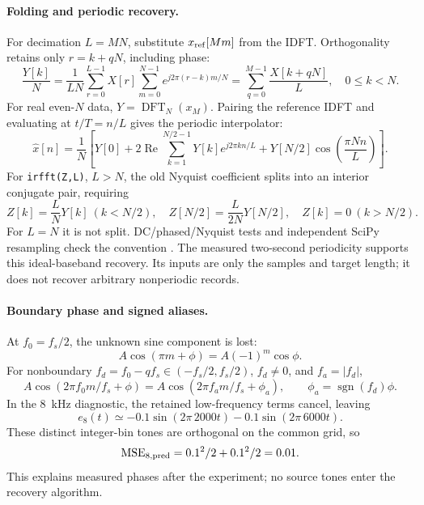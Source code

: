 \paragraph{Folding and periodic recovery.}
For decimation $L=MN$, substitute $x_{\rm ref}[Mm]$ from the IDFT.
Orthogonality retains only $r=k+qN$, including phase:
\begin{equation}
 \frac{Y[k]}N=\frac1{LN}\sum_{r=0}^{L-1}X[r]
 \sum_{m=0}^{N-1}e^{j2\pi(r-k)m/N}
 =\sum_{q=0}^{M-1}\frac{X[k+qN]}L,\quad0\le k<N.
 \label{eq:decimation-folding}
\end{equation}
For real even-$N$ data, $Y=\operatorname{DFT}_N(x_M)$. Pairing the reference
IDFT and evaluating at $t/T=n/L$ gives the periodic interpolator:
\begin{equation}
 \widehat x[n]=\frac1N\left[Y[0]
 +2\operatorname{Re}\sum_{k=1}^{N/2-1}Y[k]e^{j2\pi kn/L}
 +Y[N/2]\cos\!\left(\frac{\pi Nn}{L}\right)\right].
 \label{eq:periodic-interpolation}
\end{equation}
For \texttt{irfft(Z,L)}, $L>N$, the old Nyquist coefficient splits into
an interior conjugate pair, requiring
\begin{equation}
 Z[k]=\frac LN Y[k]\ (k<N/2),\quad
 Z[N/2]=\frac L{2N}Y[N/2],\quad Z[k]=0\ (k>N/2).
 \label{eq:interpolation-scaling}
\end{equation}
For $L=N$ it is not split. DC/phased/Nyquist tests and independent SciPy
resampling check the convention \citep{numpy21irfft,scipy1153resample}.
The measured two-second periodicity supports this ideal-baseband recovery. Its inputs are only the samples and
target length; it does not recover arbitrary nonperiodic records.

\paragraph{Boundary phase and signed aliases.}
At $f_0=f_s/2$, the unknown sine component is lost:
\begin{equation}
 A\cos(\pi m+\phi)=A(-1)^m\cos\phi.
 \label{eq:critical-phase}
\end{equation}
For nonboundary $f_d=f_0-qf_s\in(-f_s/2,f_s/2)$, $f_d\ne0$, and $f_a=|f_d|$,
\begin{equation}
 A\cos(2\pi f_0m/f_s+\phi)=A\cos(2\pi f_am/f_s+\phi_a),\qquad
 \phi_a=\operatorname{sgn}(f_d)\phi.
 \label{eq:alias-phase}
\end{equation}
In the 8~kHz diagnostic, the retained low-frequency terms cancel, leaving
\begin{equation}
 e_8(t)\simeq-0.1\sin(2\pi\,2000t)-0.1\sin(2\pi\,6000t).
 \label{eq:alias-error-model}
\end{equation}
These distinct integer-bin tones are orthogonal on the common grid, so
\begin{equation}
 \mathrm{MSE}_{8,\rm pred}=0.1^2/2+0.1^2/2=0.01.
 \label{eq:alias-error-power}
\end{equation}
This explains measured phases after the experiment; no source tones enter
the recovery algorithm.

